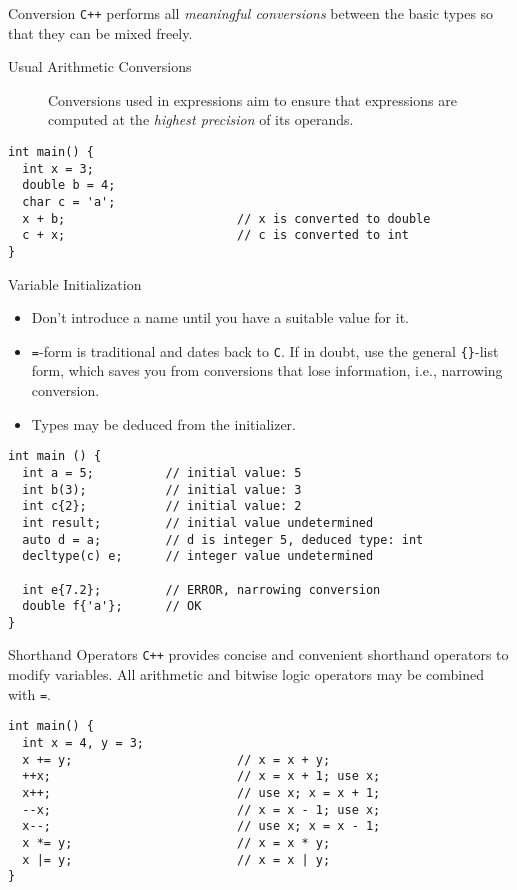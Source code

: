 \documentclass[presentation]{beamer}
\begin{document}
\begin{frame}[fragile,label={sec:orgheadline19}]{Conversion}
 \texttt{C++} performs all \emph{meaningful conversions} between the basic types
so that they can be mixed freely.

\begin{description}
\item[{Usual Arithmetic Conversions}] Conversions used in expressions
aim to ensure that expressions are computed at the \emph{highest
precision} of its operands.
\end{description}


\begin{verbatim}
int main() {
  int x = 3;
  double b = 4;
  char c = 'a';
  x + b;                        // x is converted to double
  c + x;                        // c is converted to int
}
\end{verbatim}
\end{frame}

\begin{frame}[fragile,label={sec:orgheadline20}]{Variable Initialization}
 \begin{itemize}
\item Don't introduce a name until you have a suitable value for it.
\item \texttt{=}-form is traditional and dates back to \texttt{C}.  If in doubt, use
the general \texttt{\{\}}-list form, which saves you from conversions that
lose information, i.e., narrowing conversion.
\item Types may be deduced from the initializer.
\end{itemize}

\begin{verbatim}
int main () {
  int a = 5;          // initial value: 5
  int b(3);           // initial value: 3
  int c{2};           // initial value: 2
  int result;         // initial value undetermined
  auto d = a;         // d is integer 5, deduced type: int
  decltype(c) e;      // integer value undetermined

  int e{7.2};         // ERROR, narrowing conversion
  double f{'a'};      // OK
}
\end{verbatim}
\end{frame}

\begin{frame}[fragile,label={sec:orgheadline21}]{Shorthand Operators}
 \texttt{C++} provides concise and convenient shorthand operators to modify
variables.  All arithmetic and bitwise logic operators may be
combined with \texttt{=}.

\begin{verbatim}
int main() {
  int x = 4, y = 3;
  x += y;                       // x = x + y;
  ++x;                          // x = x + 1; use x;
  x++;                          // use x; x = x + 1;
  --x;                          // x = x - 1; use x;
  x--;                          // use x; x = x - 1;
  x *= y;                       // x = x * y;
  x |= y;                       // x = x | y;
}
\end{verbatim}
\end{frame}
\end{document}
